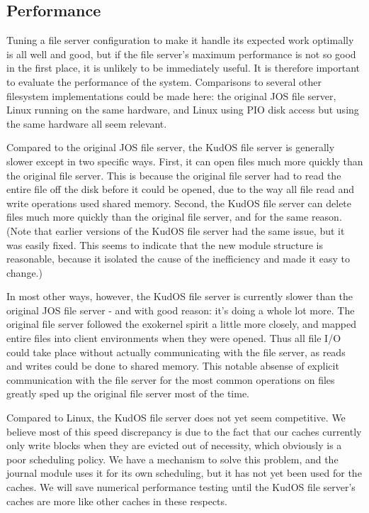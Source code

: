\subsection{Performance}
\label{sec:eval:performance}

Tuning a file server configuration to make it handle its expected work optimally
is all well and good, but if the file server's maximum performance is not so
good in the first place, it is unlikely to be immediately useful. It is
therefore important to evaluate the performance of the system. Comparisons to
several other filesystem implementations could be made here: the original JOS
file server, Linux running on the same hardware, and Linux using PIO disk access
but using the same hardware all seem relevant.

Compared to the original JOS file server, the KudOS file server is generally
slower except in two specific ways. First, it can open files much more quickly
than the original file server. This is because the original file server had to
read the entire file off the disk before it could be opened, due to the way all
file read and write operations used shared memory. Second, the KudOS file server
can delete files much more quickly than the original file server, and for the
same reason. (Note that earlier versions of the KudOS file server had the same
issue, but it was easily fixed. This seems to indicate that the new module
structure is reasonable, because it isolated the cause of the inefficiency and
made it easy to change.)

In most other ways, however, the KudOS file server is currently slower than the
original JOS file server - and with good reason: it's doing a whole lot more.
The original file server followed the exokernel spirit a little more closely,
and mapped entire files into client environments when they were opened. Thus all
file I/O could take place without actually communicating with the file server,
as reads and writes could be done to shared memory. This notable absense of
explicit communication with the file server for the most common operations on
files greatly sped up the original file server most of the time.

Compared to Linux, the KudOS file server does not yet seem competitive. We
believe most of this speed discrepancy is due to the fact that our caches
currently only write blocks when they are evicted out of necessity, which
obviously is a poor scheduling policy. We have a mechanism to solve this
problem, and the journal module uses it for its own scheduling, but it has not
yet been used for the caches. We will save numerical performance testing until
the KudOS file server's caches are more like other caches in these respects.
